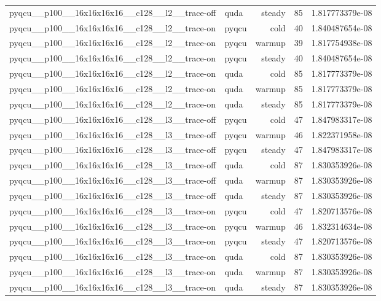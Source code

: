 \begin{table}[htbp]
\begin{tabular}{@{}llrrr@{}}
pyqcu\_\_p100\_\_16x16x16x16\_\_c128\_\_l2\_\_trace-off & quda & steady & 85 & 1.817773379e-08 \\
pyqcu\_\_p100\_\_16x16x16x16\_\_c128\_\_l2\_\_trace-on & pyqcu & cold & 40 & 1.840487654e-08 \\
pyqcu\_\_p100\_\_16x16x16x16\_\_c128\_\_l2\_\_trace-on & pyqcu & warmup & 39 & 1.817754938e-08 \\
pyqcu\_\_p100\_\_16x16x16x16\_\_c128\_\_l2\_\_trace-on & pyqcu & steady & 40 & 1.840487654e-08 \\
pyqcu\_\_p100\_\_16x16x16x16\_\_c128\_\_l2\_\_trace-on & quda & cold & 85 & 1.817773379e-08 \\
pyqcu\_\_p100\_\_16x16x16x16\_\_c128\_\_l2\_\_trace-on & quda & warmup & 85 & 1.817773379e-08 \\
pyqcu\_\_p100\_\_16x16x16x16\_\_c128\_\_l2\_\_trace-on & quda & steady & 85 & 1.817773379e-08 \\
pyqcu\_\_p100\_\_16x16x16x16\_\_c128\_\_l3\_\_trace-off & pyqcu & cold & 47 & 1.847983317e-08 \\
pyqcu\_\_p100\_\_16x16x16x16\_\_c128\_\_l3\_\_trace-off & pyqcu & warmup & 46 & 1.822371958e-08 \\
pyqcu\_\_p100\_\_16x16x16x16\_\_c128\_\_l3\_\_trace-off & pyqcu & steady & 47 & 1.847983317e-08 \\
pyqcu\_\_p100\_\_16x16x16x16\_\_c128\_\_l3\_\_trace-off & quda & cold & 87 & 1.830353926e-08 \\
pyqcu\_\_p100\_\_16x16x16x16\_\_c128\_\_l3\_\_trace-off & quda & warmup & 87 & 1.830353926e-08 \\
pyqcu\_\_p100\_\_16x16x16x16\_\_c128\_\_l3\_\_trace-off & quda & steady & 87 & 1.830353926e-08 \\
pyqcu\_\_p100\_\_16x16x16x16\_\_c128\_\_l3\_\_trace-on & pyqcu & cold & 47 & 1.820713576e-08 \\
pyqcu\_\_p100\_\_16x16x16x16\_\_c128\_\_l3\_\_trace-on & pyqcu & warmup & 46 & 1.832314634e-08 \\
pyqcu\_\_p100\_\_16x16x16x16\_\_c128\_\_l3\_\_trace-on & pyqcu & steady & 47 & 1.820713576e-08 \\
pyqcu\_\_p100\_\_16x16x16x16\_\_c128\_\_l3\_\_trace-on & quda & cold & 87 & 1.830353926e-08 \\
pyqcu\_\_p100\_\_16x16x16x16\_\_c128\_\_l3\_\_trace-on & quda & warmup & 87 & 1.830353926e-08 \\
pyqcu\_\_p100\_\_16x16x16x16\_\_c128\_\_l3\_\_trace-on & quda & steady & 87 & 1.830353926e-08 \\

\end{tabular}
\end{table}
